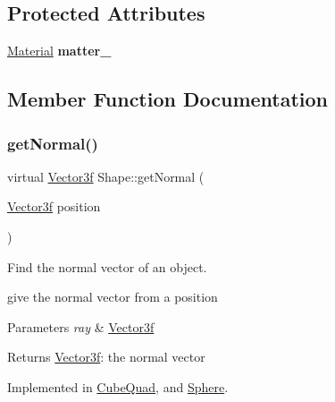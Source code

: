 \subsection*{Protected Attributes}
\begin{DoxyCompactItemize}
\item 
\mbox{\label{class_shape_a233d59f3966db1560b944cc33a4712de}} 
\mbox{\hyperlink{class_material}{Material}} {\bfseries matter\+\_\+}
\end{DoxyCompactItemize}


\subsection{Member Function Documentation}
\mbox{\label{class_shape_afba80076ff9eb95f7e7c4144e323590f}} 
\subsubsection{\texorpdfstring{get\+Normal()}{getNormal()}}
{\footnotesize\ttfamily virtual \mbox{\hyperlink{class_vector3f}{Vector3f}} Shape\+::get\+Normal (\begin{DoxyParamCaption}\item[{\mbox{\hyperlink{class_vector3f}{Vector3f}}}]{position }\end{DoxyParamCaption})\hspace{0.3cm}{\ttfamily [pure virtual]}}



Find the normal vector of an object. 

give the normal vector from a position 
\begin{DoxyParams}{Parameters}
{\em ray} & \mbox{\hyperlink{class_vector3f}{Vector3f}} \\
\hline
\end{DoxyParams}
\begin{DoxyReturn}{Returns}
\mbox{\hyperlink{class_vector3f}{Vector3f}}\+: the normal vector 
\end{DoxyReturn}


Implemented in \mbox{\hyperlink{class_cube_quad_aba1f984ce9580e2e430ace0137a0f249}{Cube\+Quad}}, and \mbox{\hyperlink{class_sphere_a46b57f659960b0862efcb6a7be9f1846}{Sphere}}.

\mbox{\label{class_shape_aae1d31ff6fb4237397bf11afd07d7e48}} 
